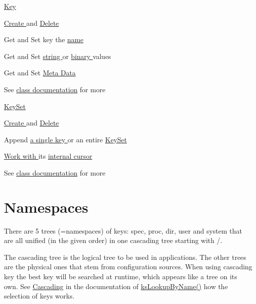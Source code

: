 \hyperlink{group__key}{Key }
\begin{DoxyItemize}
\item \hyperlink{group__key_gad23c65b44bf48d773759e1f9a4d43b89}{Create } and \hyperlink{group__key_ga3df95bbc2494e3e6703ece5639be5bb1}{Delete }
\item Get and Set key the \hyperlink{group__keyname_ga7699091610e7f3f43d2949514a4b35d9}{name }
\item Get and Set \hyperlink{group__keyvalue_ga622bde1eb0e0c4994728331326340ef2}{string } or \hyperlink{group__keyvalue_gaa50a5358fd328d373a45f395fa1b99e7}{binary } values
\item Get and Set \hyperlink{group__keymeta}{Meta Data }
\item See \hyperlink{group__key}{class documentation} for more
\end{DoxyItemize}

\hyperlink{group__keyset}{Key\-Set }
\begin{DoxyItemize}
\item \hyperlink{group__keyset_ga671e1aaee3ae9dc13b4834a4ddbd2c3c}{Create } and \hyperlink{group__keyset_ga27e5c16473b02a422238c8d970db7ac8}{Delete }
\item Append \hyperlink{group__keyset_gaa5a1d467a4d71041edce68ea7748ce45}{a single key } or an entire \hyperlink{group__keyset_ga21eb9c3a14a604ee3a8bdc779232e7b7}{Key\-Set }
\item \hyperlink{group__keyset_ga317321c9065b5a4b3e33fe1c399bcec9}{Work with } its \hyperlink{group__keyset_ga4287b9416912c5f2ab9c195cb74fb094}{internal cursor }
\item See \hyperlink{group__keyset}{class documentation} for more
\end{DoxyItemize}\hypertarget{index_namespace}{}\section{Namespaces}\label{index_namespace}
There are 5 trees (=namespaces) of keys\-: {\ttfamily spec}, {\ttfamily proc}, {\ttfamily dir}, {\ttfamily user} and {\ttfamily system} that are all unified (in the given order) in one cascading tree starting with {\ttfamily /}.

The cascading tree is the logical tree to be used in applications. The other trees are the physical ones that stem from configuration sources. When using cascading key the best key will be searched at runtime, which appears like a tree on its own. See \hyperlink{group__keyset_cascading}{Cascading} in the documentation of \hyperlink{group__keyset_gad2e30fb6d4739d917c5abb2ac2f9c1a1}{ks\-Lookup\-By\-Name()} how the selection of keys works.



